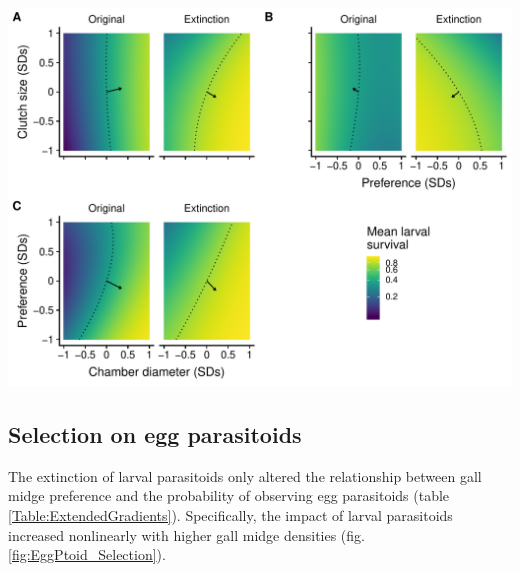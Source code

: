 \documentclass[11pt,]{article}
\let\origfigure\figure
\let\endorigfigure\endfigure
\renewenvironment{figure}[1][2] {
    \expandafter\origfigure\expandafter[H]
} {
    \endorigfigure
}
\begin{document}
\begin{figure}
\centering
\includegraphics{../analyses/MV_landscapes.pdf}
\caption{\label{fig:MV_Landscape}Two dimensional view of adaptive
landscapes of gall midge phenotypes in the original food web and with
the extinction of larval parasitoids. Each panel corresponds to a
different combination of phenotypic traits: clutch size and chamber
diameter (A); clutch size and oviposition preference (B); oviposition
preference and chamber diameter (C). Arrows represent mean estimates of
directional selection gradients, while contours represent predicted
larval survival of the mean phenotype in each food-web treatment. Notice
that arrows point more toward a corner of the adaptive landscape for
each combination of traits with the extinction of larval parasitoids
compared to the original food web. This indicates that consumer
extinctions more strongly favored trait integration (covariance). Note
that mean larval survival is plotted on a natural log scale to reflect
the mathematical definition of the adaptive landscape.}
\end{figure}

\subsection{Selection on egg
parasitoids}\label{selection-on-egg-parasitoids}

The extinction of larval parasitoids only altered the relationship
between gall midge preference and the probability of observing egg
parasitoids (table \ref{Table:ExtendedGradients}). Specifically, the
impact of larval parasitoids increased nonlinearly with higher gall
midge densities (fig. \ref{fig:EggPtoid_Selection}).
\end{document}
